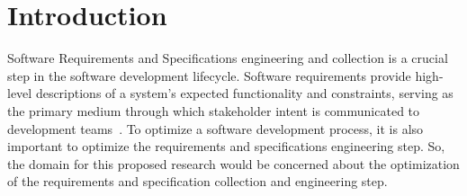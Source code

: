 \documentclass[sigconf,review]{acmart}
\begin{document}

\section{Introduction}

Software Requirements and Specifications engineering and collection is a crucial step in the software development lifecycle. Software requirements provide high-level descriptions of a system’s expected functionality and constraints, serving as the primary medium through which stakeholder intent is communicated to development teams~\cite{pohl2016requirements}. To optimize a software development process, it is also important to optimize the requirements and specifications engineering step. So, the domain for this proposed research would be concerned about the optimization of the requirements and specification collection and engineering step. 
\end{document}

